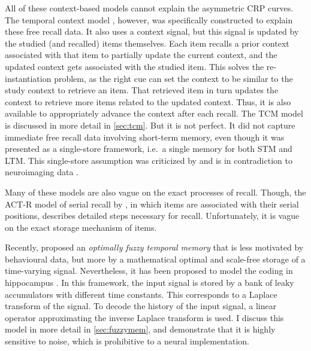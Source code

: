 All of these context-based models cannot explain the asymmetric CRP curves.
The temporal context model \parencite{Howard2002}, however, was specifically constructed to explain these free recall data.
It also uses a context signal, but this signal is updated by the studied (and recalled) items themselves.
Each item recalls a prior context associated with that item to partially update the current context, and the updated context gets associated with the studied item.
This solves the re-instantiation problem, as the right cue can set the context to be similar to the study context to retrieve an item.
That retrieved item in turn updates the context to retrieve more items related to the updated context.
Thus, it is also available to appropriately advance the context after each recall.
The TCM model is discussed in more detail in \cref{sec:tcm}.
But it is not perfect.
It did not capture immediate free recall data involving short-term memory, even though it was presented as a single-store framework, i.e.\ a single memory for both STM and LTM\@.
This single-store assumption was criticized by \textcite{Davelaar2008} and is in contradiction to neuroimaging data \parencite{talmi2005}.

Many of these models are also vague on the exact processes of recall.
Though, the ACT-R model of serial recall by \textcite{Anderson1997}, in which items are associated with their serial positions, describes detailed steps necessary for recall.
Unfortunately, it is vague on the exact storage mechanism of items.

Recently, \textcite{shankar2013} proposed an \emph{optimally fuzzy temporal memory} that is less motivated by behavioural data, but more by a mathematical optimal and scale-free storage of a time-varying signal.
Nevertheless, it has been proposed to model the coding in hippocampus \parencite{howard2014-1}.
In this framework, the input signal is stored by a bank of leaky accumulators with different time constants.
This corresponds to a Laplace transform of the signal.
To decode the history of the input signal, a linear operator approximating the inverse Laplace transform is used.
I discuss this model in more detail in \cref{sec:fuzzymem}, and demonstrate that it is highly sensitive to noise, which is prohibitive to a neural implementation.


